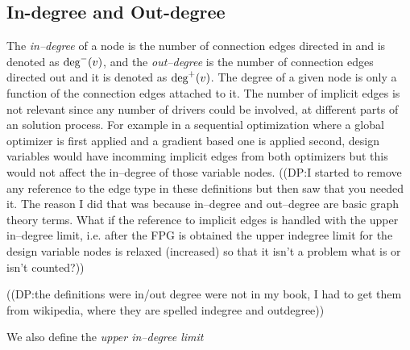 \subsection{In-degree and Out-degree}
\label{s:indegree-outdegree}
The \emph{in--degree} of a node is the number of connection edges directed in and 
is denoted as $\textrm{deg}^-(v)$, and the \emph{out--degree} 
is the number of connection edges directed out and it is denoted as $\textrm{deg}^+(v)$.
The degree of a given node is only a function of the connection edges 
attached to it. The number of implicit edges is not relevant since any number 
of drivers could be involved, at different parts of an solution process. For 
example in a sequential optimization where a global optimizer is first applied
and a gradient based one is applied second, design variables would have incomming 
implicit edges from both optimizers but this would not affect the in--degree of those
variable nodes. 
((DP:I started to remove any reference to the edge type in these definitions but then saw that you needed it. The reason I did that was because in--degree and out--degree are basic graph theory terms. What if the reference to implicit edges is handled with the upper in--degree limit, i.e. after the FPG is obtained the upper indegree limit for the design variable nodes is relaxed (increased) so that it isn't a problem what is or isn't counted?))

((DP:the definitions were in/out degree were not in my book, I had to get them from wikipedia, where they are spelled indegree and outdegree))

We also define the \emph{upper in--degree limit} 

